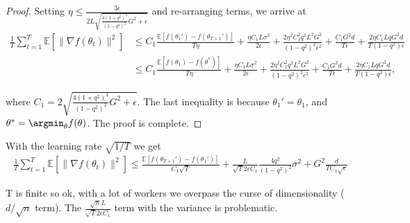 \documentclass[11pt]{article}
\begin{document}
\begin{proof}
Setting $\eta \leq \frac{3\epsilon}{2L\sqrt{\frac{4(1+q^2)^3}{(1-q^2)^2}G^2+\epsilon}}$ and re-arranging terms, we arrive at
\begin{align*}
    \frac{1}{T} \sum_{t=1}^T\mathbb E[\|\nabla f(\theta_t)\|^2]  &\leq C_1\frac{\mathbb E[f(\theta_1')-f(\theta_{T+1}')]}{T \eta} + \frac{\eta C_1 L \sigma^2}{2\epsilon}+\frac{2\eta^2 C_1^2q^2 L^2G^2}{(1-q^2)^2\epsilon^2}+\frac{C_1 G^2d}{T \epsilon}+\frac{2\eta C_1LqG^2d}{T(1-q^2)\epsilon}\\
    &\leq C_1\frac{\mathbb E[f(\theta_1)-f(\theta^*)]}{T \eta} + \frac{\eta C_1 L \sigma^2}{2\epsilon}+\frac{2\eta^2 C_1^2q^2 L^2G^2}{(1-q^2)^2\epsilon^2}+\frac{C_1G^2d}{T\epsilon}+\frac{2\eta C_1LqG^2d}{T(1-q^2)\epsilon},
\end{align*}

where $C_1 = 2\sqrt{\frac{4(1+q^2)^3}{(1-q^2)^2}G^2+\epsilon}$. The last inequality is because $\theta_1'=\theta_1$, and $\theta^*=\argmin_\theta f(\theta)$. The proof is complete.

\end{proof}


With the learning rate $\sqrt{1/T}$ we get
\begin{align*}
\frac{1}{T} \sum_{t=1}^T\mathbb E[\|\nabla f(\theta_t)\|^2]   \leq \frac{\mathbb E[f(\theta_{T+1}')-f(\theta_1')]}{C_1 \sqrt{T} } +  \frac{ L}{\sqrt{T}2\epsilon C_1}\frac{4q^2}{(1-q^2)^2}\sigma^2 + G^2 \frac{d}{T C_1 \sqrt{\epsilon}}
\end{align*}


T is finite so ok, with a lot of workers we overpass the curse of dimensionality ($d/\sqrt{n}$ term).
The $ \frac{\sqrt{n} L}{\sqrt{T}2\epsilon C_1}$ term with the variance is problematic.



\clearpage



\end{document}
